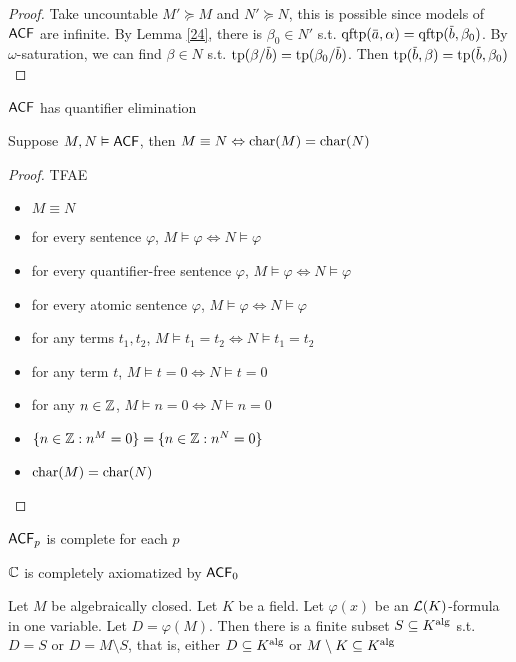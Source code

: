 \documentclass[11pt]{article}
\begin{document}
\begin{proof}
Take uncountable \(M'\succeq M\) and \(N'\succeq N\), this is possible since models of \(\textsf{ACF}\) are
infinite. By Lemma \ref{24}, there is \(\beta_0\in N'\) s.t. \(\qftp(\bara,\alpha)=\qftp(\barb,\beta_0)\). By
\(\omega\)-saturation, we can find \(\beta\in N\) s.t. \(\tp(\beta/\barb)=\tp(\beta_0/\barb)\). Then \(\tp(\barb,\beta)=\tp(\barb,\beta_0)\)
\end{proof}

\begin{theorem}[]
\(\textsf{ACF}\) has quantifier elimination
\end{theorem}

\begin{theorem}[]
Suppose \(M,N\vDash\textsf{ACF}\), then \(M\equiv N\Leftrightarrow\operatorname{char}(M)=\operatorname{char}(N)\)
\end{theorem}

\begin{proof}
TFAE
\begin{itemize}
\item \(M\equiv N\)
\item for every sentence \(\varphi\), \(M\vDash\varphi\Leftrightarrow N\vDash\varphi\)
\item for every quantifier-free sentence \(\varphi\), \(M\vDash\varphi\Leftrightarrow N\vDash\varphi\)
\item for every atomic sentence \(\varphi\), \(M\vDash\varphi\Leftrightarrow N\vDash\varphi\)
\item for any terms \(t_1,t_2\), \(M\vDash t_1=t_2\Leftrightarrow N\vDash t_1=t_2\)
\item for any term \(t\), \(M\vDash t=0\Leftrightarrow N\vDash t=0\)
\item for any \(n\in\mathbb{Z}\), \(M\vDash n=0\Leftrightarrow N\vDash n=0\)
\item \(\{n\in\mathbb{Z}:n^M=0\}=\{n\in\mathbb{Z}:n^N=0\}\)
\item \(\operatorname{char}(M)=\operatorname{char}(N)\)
\end{itemize}
\end{proof}

\begin{corollary}[]
\(\textsf{ACF}_p\) is complete for each \(p\)
\end{corollary}

\begin{corollary}[]
\(\mathbb{C}\) is completely axiomatized by \(\textsf{ACF}_0\)
\end{corollary}

\begin{lemma}[]
Let \(M\) be algebraically closed. Let \(K\) be a field. Let \(\varphi(x)\) be an \(\mathcal{L}(K)\)-formula in
one variable. Let \(D=\varphi(M)\). Then there is a finite subset \(S\subseteq K^{\operatorname{\text{alg}}}\) s.t. \(D=S\)
or \(D=M\setminus S\), that is, either \(D\subseteq K^{\operatorname{\text{alg}}}\) or \(M\setminus K\subseteq K^{\operatorname{\text{alg}}}\)
\end{lemma}
\end{document}
